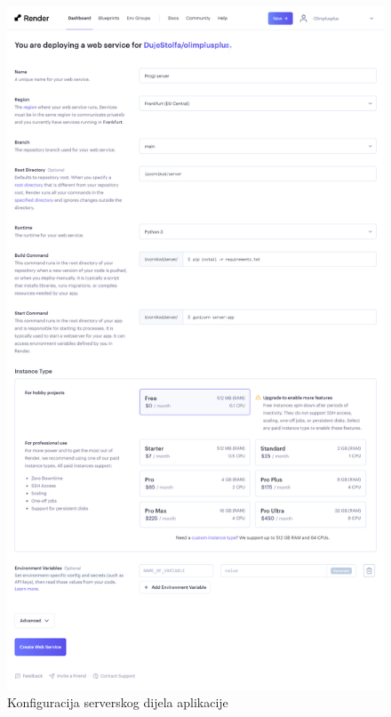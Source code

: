         \begin{figure}[htp]
			\includegraphics[scale=0.14]{slike/deploy_7.png}
			\centering
			\caption{Konfiguracija serverskog dijela aplikacije}
            \label{fig:dep-7}
		\end{figure}

